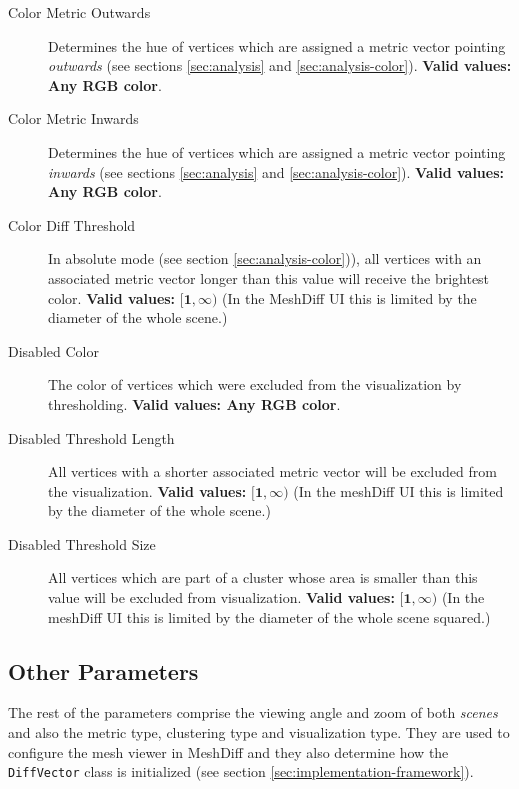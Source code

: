 \begin{description}
\item [Color Metric Outwards] Determines the hue of vertices which are assigned a metric vector pointing {\it outwards} (see sections \ref{sec:analysis} and \ref{sec:analysis-color}). {\bf Valid values: Any RGB color}.

\item [Color Metric Inwards] Determines the hue of vertices which are assigned a metric vector pointing {\it inwards} (see sections \ref{sec:analysis} and \ref{sec:analysis-color}). {\bf Valid values: Any RGB color}.

\item [Color Diff Threshold] In absolute mode (see section \ref{sec:analysis-color})), all vertices with an associated metric vector longer than this value will receive the brightest color. {\bf Valid values:} \(\bm{[1, \infty)}\) (In the MeshDiff UI this is limited by the diameter of the whole scene.)

\item [Disabled Color] The color of vertices which were excluded from the visualization by thresholding. {\bf Valid values: Any RGB color}.

\item [Disabled Threshold Length] All vertices with a shorter associated metric vector will be excluded from the visualization. {\bf Valid values:} \(\bm{[1, \infty)}\) (In the meshDiff UI this is limited by the diameter of the whole scene.)

\item [Disabled Threshold Size] All vertices which are part of a cluster whose area is smaller than this value will be excluded from visualization. {\bf Valid values:} \(\bm{[1, \infty)}\) (In the meshDiff UI this is limited by the diameter of the whole scene squared.)
\end{description}

\subsection{Other Parameters}

The rest of the parameters comprise the viewing angle and zoom of both {\it scenes} and also the metric type, clustering type and visualization type. They are used to configure the mesh viewer in MeshDiff and they also determine how the \verb+DiffVector+ class is initialized (see section \ref{sec:implementation-framework}).

